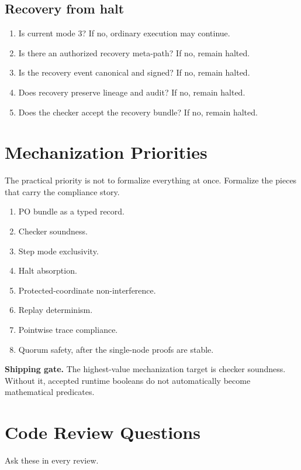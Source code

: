 \documentclass[11pt,oneside]{article}
\newenvironment{shipbox}{\begin{shaded}\noindent\textbf{Shipping gate.} }{\end{shaded}}
\begin{document}
\subsection{Recovery from halt}
\begin{enumerate}
\item Is current mode 3? If no, ordinary execution may continue.
\item Is there an authorized recovery meta-path? If no, remain halted.
\item Is the recovery event canonical and signed? If no, remain halted.
\item Does recovery preserve lineage and audit? If no, remain halted.
\item Does the checker accept the recovery bundle? If no, remain halted.
\end{enumerate}

\section{Mechanization Priorities}
The practical priority is not to formalize everything at once. Formalize the pieces that carry the compliance story.

\begin{enumerate}
\item PO bundle as a typed record.
\item Checker soundness.
\item Step mode exclusivity.
\item Halt absorption.
\item Protected-coordinate non-interference.
\item Replay determinism.
\item Pointwise trace compliance.
\item Quorum safety, after the single-node proofs are stable.
\end{enumerate}

\begin{shipbox}
The highest-value mechanization target is checker soundness. Without it, accepted runtime booleans do not automatically become mathematical predicates.
\end{shipbox}

\section{Code Review Questions}
Ask these in every review.
\end{document}
